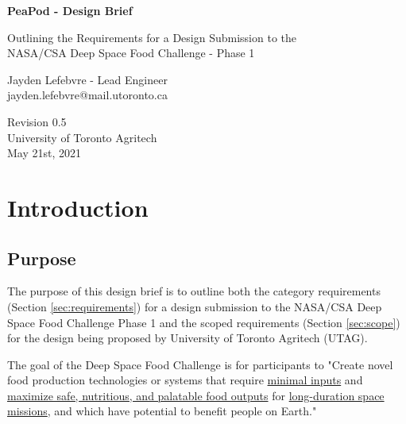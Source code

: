 \documentclass{report}
\begin{document}
\begin{titlepage}
    \begin{center}
        \vspace*{1.2cm}

        \textbf{\large{PeaPod - Design Brief}}

        \vspace{0.5cm}

        Outlining the Requirements for a Design Submission to the \\NASA/CSA Deep Space Food Challenge - Phase 1

        \vfill

        Jayden Lefebvre - Lead Engineer\\\small{jayden.lefebvre@mail.utoronto.ca}

        \vspace{2.5cm}

        Revision 0.5\\
        University of Toronto Agritech\\
        May 21st, 2021

    \end{center}
\end{titlepage}

\thispagestyle{plain}

\tableofcontents
\newpage

\section{Introduction}
\label{sec:intro}

\subsection{Purpose}
\label{sec:purpose}

The purpose of this design brief is to outline both the category requirements (Section \ref{sec:requirements}) for a design submission to the NASA/CSA Deep Space Food Challenge Phase 1 \cite{dsfc} and the scoped requirements (Section \ref{sec:scope}) for the design being proposed by University of Toronto Agritech (UTAG).

The goal of the Deep Space Food Challenge is for participants to "Create novel food production technologies or systems that require \uline{minimal inputs} and \uline{maximize safe, nutritious, and palatable food outputs} for \uline{long-duration space missions}, and which have potential to benefit people on Earth." \cite{applicantguide}
\end{document}
